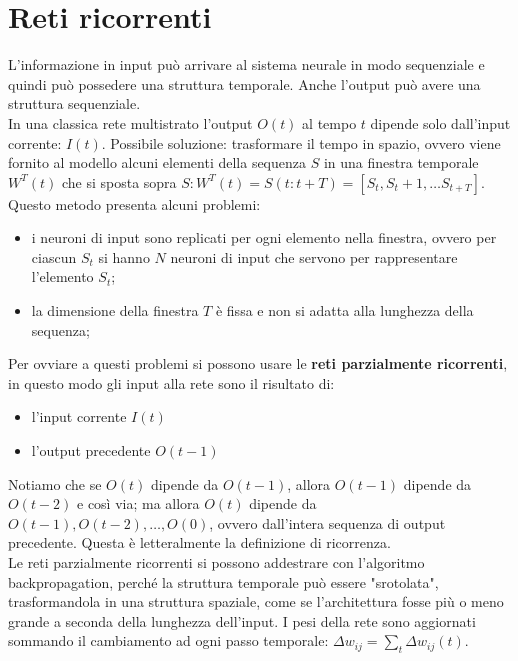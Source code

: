 \section{Reti ricorrenti}

L'informazione in input può arrivare al sistema neurale in modo sequenziale e
quindi può possedere una struttura temporale. Anche l'output può avere una
struttura sequenziale.\\
In una classica rete multistrato l'output $O(t)$ al tempo $t$ dipende solo
dall'input corrente: $I(t)$. Possibile soluzione: trasformare il tempo in
spazio, ovvero viene fornito al modello alcuni elementi della sequenza $S$ in
una finestra temporale $W^T(t)$ che si sposta sopra $S: W^T(t) = S(t:t+T) =
[S_t, S_t+1, \dots S_{t+T}]$.\\
Questo metodo presenta alcuni problemi:
\begin{itemize}
	\item i neuroni di input sono replicati per ogni elemento nella finestra,
		ovvero per ciascun $S_t$ si hanno $N$ neuroni di input che servono per
		rappresentare l'elemento $S_t$;

	\item la dimensione della finestra $T$ è fissa e non si adatta alla
		lunghezza della sequenza;
\end{itemize}

Per ovviare a questi problemi si possono usare le \textbf{reti parzialmente 
ricorrenti}, in questo modo gli input alla rete sono il risultato di:
\begin{itemize}
	\item l'input corrente $I(t)$
	\item l'output precedente $O(t-1)$
\end{itemize}

Notiamo che se $O(t)$ dipende da $O(t-1)$, allora $O(t-1)$ dipende da $O(t-2)$ e
così via; ma allora $O(t)$ dipende da $O(t-1), O(t-2), \dots, O(0)$, ovvero
dall'intera sequenza di output precedente. Questa è letteralmente la definizione
di ricorrenza.\\
Le reti parzialmente ricorrenti si possono addestrare con l'algoritmo
backpropagation, perché la struttura temporale può essere "srotolata",
trasformandola in una struttura spaziale, come se l'architettura fosse più o
meno grande a seconda della lunghezza dell'input. I pesi della rete sono
aggiornati sommando il cambiamento ad ogni passo temporale: $\Delta w_{ij} =
\sum_t \Delta w_{ij}(t)$.\\

